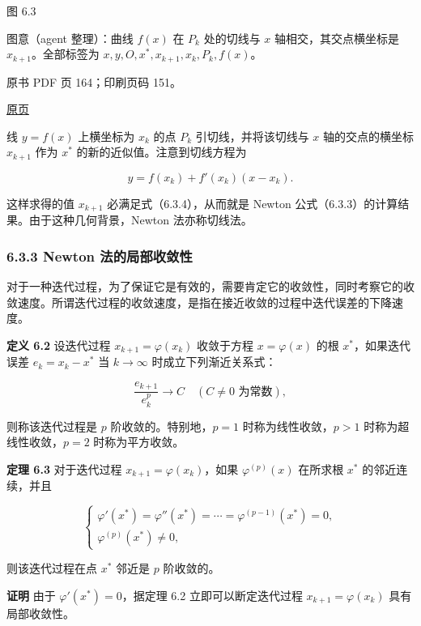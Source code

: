图 6.3

图意（agent 整理）：曲线 \(f(x)\) 在 \(P_k\) 处的切线与 \(x\) 轴相交，其交点横坐标是 \(x_{k+1}\)。全部标签为 \(x,\allowbreak y,\allowbreak O,\allowbreak x^*,\allowbreak x_{k+1},\allowbreak x_k,\allowbreak P_k,\allowbreak f(x)\)。

\clearpage

原书 PDF 页 164；印刷页码 151。

\href{source-images/pdf-164.jpeg}{原页}

线 \(y=f(x)\) 上横坐标为 \(x_k\) 的点 \(P_k\) 引切线，并将该切线与 \(x\) 轴的交点的横坐标 \(x_{k+1}\) 作为 \(x^*\) 的新的近似值。注意到切线方程为

\[
y=f(x_k)+f'(x_k)(x-x_k).
\]

这样求得的值 \(x_{k+1}\) 必满足式（6.3.4），从而就是 Newton 公式（6.3.3）的计算结果。由于这种几何背景，Newton 法亦称切线法。

\subsubsection{6.3.3 Newton 法的局部收敛性}\label{ch06-newton-ux6cd5ux7684ux5c40ux90e8ux6536ux655bux6027}

对于一种迭代过程，为了保证它是有效的，需要肯定它的收敛性，同时考察它的收敛速度。所谓迭代过程的收敛速度，是指在接近收敛的过程中迭代误差的下降速度。

\textbf{定义 6.2} 设迭代过程 \(x_{k+1}=\varphi(x_k)\) 收敛于方程 \(x=\varphi(x)\) 的根 \(x^*\)，如果迭代误差 \(e_k=x_k-x^*\) 当 \(k\to\infty\) 时成立下列渐近关系式：

\[
\frac{e_{k+1}}{e_k^p}\to C\quad(C\ne0\text{ 为常数}),
\]

则称该迭代过程是 \(p\) 阶收敛的。特别地，\(p=1\) 时称为线性收敛，\(p>1\) 时称为超线性收敛，\(p=2\) 时称为平方收敛。

\textbf{定理 6.3} 对于迭代过程 \(x_{k+1}=\varphi(x_k)\)，如果 \(\varphi^{(p)}(x)\) 在所求根 \(x^*\) 的邻近连续，并且

\[
\begin{cases}
\varphi'(x^*)=\varphi''(x^*)=\cdots=\varphi^{(p-1)}(x^*)=0,\\
\varphi^{(p)}(x^*)\ne0,
\end{cases}
\tag{6.3.5}
\]

则该迭代过程在点 \(x^*\) 邻近是 \(p\) 阶收敛的。

\textbf{证明} 由于 \(\varphi'(x^*)=0\)，据定理 6.2 立即可以断定迭代过程 \(x_{k+1}=\varphi(x_k)\) 具有局部收敛性。

